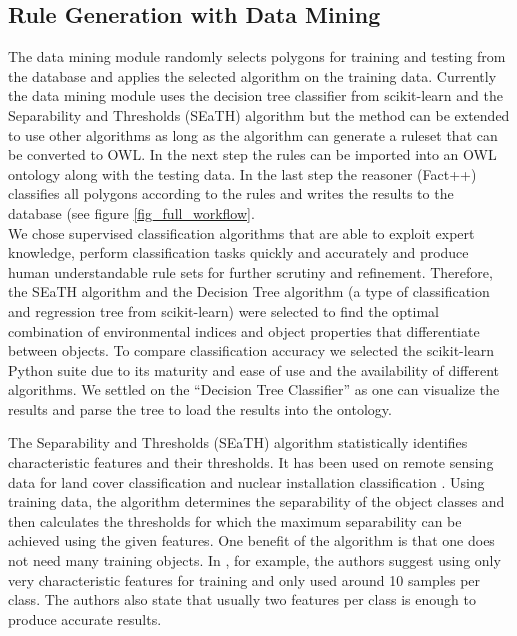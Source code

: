 \documentclass[authoryear, review,12pt,number]{elsarticle}
\begin{document}
\subsection{Rule Generation with Data Mining}
The data mining module randomly
selects polygons for training and testing from the database and applies the
selected algorithm on the training data. 
Currently the data mining module uses the decision tree classifier from
scikit-learn \citep{scikit-learn} and the Separability and Thresholds (SEaTH)
algorithm \citep{Nussbaum2006} but the method can be extended to use other
algorithms as long as the algorithm can generate a ruleset that can be
converted to OWL. In the next step the rules can be imported into an OWL
ontology along with the testing data. In the last step the reasoner (Fact++) classifies all polygons according
to the rules and writes the results to the database (see figure
\ref{fig_full_workflow}.\\ We chose supervised classification algorithms that
are able to exploit expert knowledge, perform classification tasks quickly and
accurately and produce human understandable rule sets for further scrutiny and
refinement. Therefore, the SEaTH algorithm and the Decision Tree algorithm (a
type of classification and regression tree from scikit-learn) were selected to
find the optimal combination of environmental indices and object properties
that differentiate between objects.  To compare classification accuracy we
selected the scikit-learn Python suite \citep{scikit-learn} due to its maturity
and ease of use and the availability of different algorithms. We settled on the
``Decision Tree Classifier'' as one can visualize the results and parse the
tree to load the results into the ontology.  

The Separability and Thresholds (SEaTH) algorithm \citep{Nussbaum2006}
statistically identifies characteristic features and their thresholds. It has
been used on remote sensing data for land cover classification \citep{Gao2011}
and nuclear installation classification \citep{Nussbaum2006}. Using training
data, the algorithm determines the separability of the object classes and then
calculates the thresholds for which the maximum separability can be achieved
using the given features. One benefit of the algorithm is that one does not
need many training objects.  In  \cite{Nussbaum2006}, for example, the authors
suggest using only very characteristic features for training and only used
around 10 samples per class. The authors also state that usually two features
per class is enough to produce accurate results.\\
\end{document}
